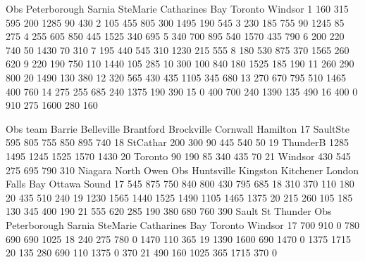 \documentclass{article}
\begin{document}
\begin{Woutput}
Obs Peterborough  Sarnia  SteMarie  Catharines    Bay    Toronto  Windsor
  1      160        315      595        200       1285       90      430
  2      105        455      805        300       1495      190      545
  3      230        185      755         90       1245       85      275
  4      255        605      850        445       1525      340      695
  5      340        700      895        540       1570      435      790
  6      200        220      740         50       1430       70      310
  7      195        440      545        310       1230      215      555
  8      180        530      875        370       1565      260      620
  9      220        190      750        110       1440      105      285
 10      300        100      840        180       1525      185      190
 11      260        290      800         20       1490      130      380
 12      320        565      430        435       1105      345      680
 13      270        670      795        510       1465      400      760
 14      275        255      685        240       1375      190      390
 15        0        400      700        240       1390      135      490
 16      400          0      910        275       1600      280      160

Obs   team   Barrie Belleville Brantford Brockville Cornwall Hamilton
 17 SaultSte   595      805        755       850       895      740
 18 StCathar   200      300         90       445       540       50
 19 ThunderB  1285     1495       1245      1525      1570     1430
 20 Toronto     90      190         85       340       435       70
 21 Windsor    430      545        275       695       790      310
                                             Niagara  North           Owen
Obs Huntsville  Kingston  Kitchener  London   Falls    Bay   Ottawa  Sound
 17     545        875        750      840      800     430    795     685
 18     310        370        110      180       20     435    510     240
 19    1230       1565       1440     1525     1490    1105   1465    1375
 20     215        260        105      185      130     345    400     190
 21     555        620        285      190      380     680    760     390
                            Sault       St      Thunder
Obs Peterborough  Sarnia  SteMarie  Catharines    Bay    Toronto  Windsor
 17      700        910        0        780        690      690     1025
 18      240        275      780          0       1470      110      365
 19     1390       1600      690       1470          0     1375     1715
 20      135        280      690        110       1375        0      370
 21      490        160     1025        365       1715      370        0


\end{Woutput}
\end{document}
